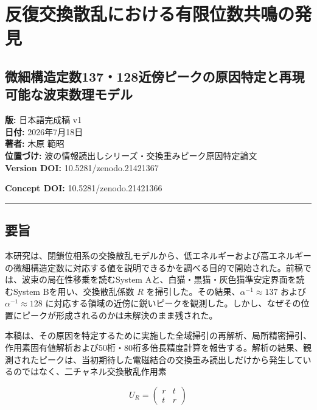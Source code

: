 \documentclass[
  10pt,
  a4paper,
]{article}
\author{}
\date{}
\begin{document}
\section{反復交換散乱における有限位数共鳴の発見}\label{ux53cdux5fa9ux4ea4ux63dbux6563ux4e71ux306bux304aux3051ux308bux6709ux9650ux4f4dux6570ux5171ux9cf4ux306eux767aux898b}

\subsection{微細構造定数137・128近傍ピークの原因特定と再現可能な波束数理モデル}\label{ux5faeux7d30ux69cbux9020ux5b9aux6570137128ux8fd1ux508dux30d4ux30fcux30afux306eux539fux56e0ux7279ux5b9aux3068ux518dux73feux53efux80fdux306aux6ce2ux675fux6570ux7406ux30e2ux30c7ux30eb}

\textbf{版:} 日本語完成稿 v1\\
\textbf{日付:} 2026年7月18日\\
\textbf{著者:} 木原 範昭\\
\textbf{位置づけ:} 波の情報読出しシリーズ・交換重みピーク原因特定論文\\
\textbf{Version DOI:} 10.5281/zenodo.21421367

\textbf{Concept DOI:} 10.5281/zenodo.21421366

\begin{center}\rule{0.5\linewidth}{0.5pt}\end{center}

\subsection{要旨}\label{ux8981ux65e8}

本研究は、閉鎖位相系の交換散乱モデルから、低エネルギーおよび高エネルギーの微細構造定数に対応する値を説明できるかを調べる目的で開始された。前稿では、波束の局在性移乗を読むSystem
Aと、白猫・黒猫・灰色猫準安定界面を読むSystem Bを用い、交換散乱係数
\(R\) を掃引した。その結果、\(\alpha^{-1}\approx137\) および
\(\alpha^{-1}\approx128\)
に対応する領域の近傍に鋭いピークを観測した。しかし、なぜその位置にピークが形成されるのかは未解決のまま残された。

本稿は、その原因を特定するために実施した全域掃引の再解析、局所精密掃引、作用素固有値解析および50桁・80桁多倍長精度計算を報告する。解析の結果、観測されたピークは、当初期待した電磁結合の交換重み読出しだけから発生しているのではなく、二チャネル交換散乱作用素

\[
U_R=
\begin{pmatrix}
r&t\\
t&r
\end{pmatrix}
\]
\end{document}
